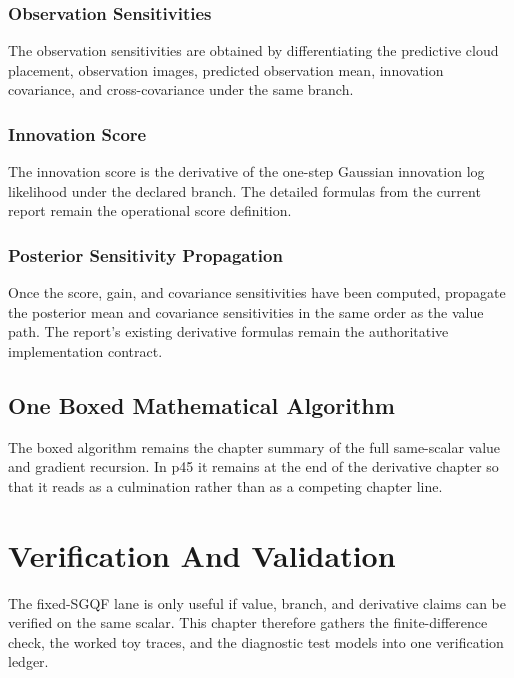 \documentclass[11pt]{article}
\numberwithin{equation}{section}
\begin{document}
\subsubsection{Observation Sensitivities}
\label{subsec:p31-observation-sensitivities}

The observation sensitivities are obtained by differentiating the predictive cloud
placement, observation images, predicted observation mean, innovation covariance,
and cross-covariance under the same branch.

\subsubsection{Innovation Score}
\label{subsec:p31-innovation-score}

The innovation score is the derivative of the one-step Gaussian innovation log
likelihood under the declared branch.  The detailed formulas from the current
report remain the operational score definition.

\subsubsection{Posterior Sensitivity Propagation}
\label{subsec:p31-posterior-sensitivity}

Once the score, gain, and covariance sensitivities have been computed, propagate
the posterior mean and covariance sensitivities in the same order as the value
path.  The report's existing derivative formulas remain the authoritative
implementation contract.

\subsection{One Boxed Mathematical Algorithm}
\label{sec:p31-boxed-algorithm}

The boxed algorithm remains the chapter summary of the full same-scalar value and
gradient recursion.  In p45 it remains at the end of the derivative chapter so
that it reads as a culmination rather than as a competing chapter line.

\section{Verification And Validation}
\label{sec:p31-fd}

The fixed-SGQF lane is only useful if value, branch, and derivative claims can be
verified on the same scalar.  This chapter therefore gathers the finite-difference
check, the worked toy traces, and the diagnostic test models into one verification
ledger.
\end{document}
